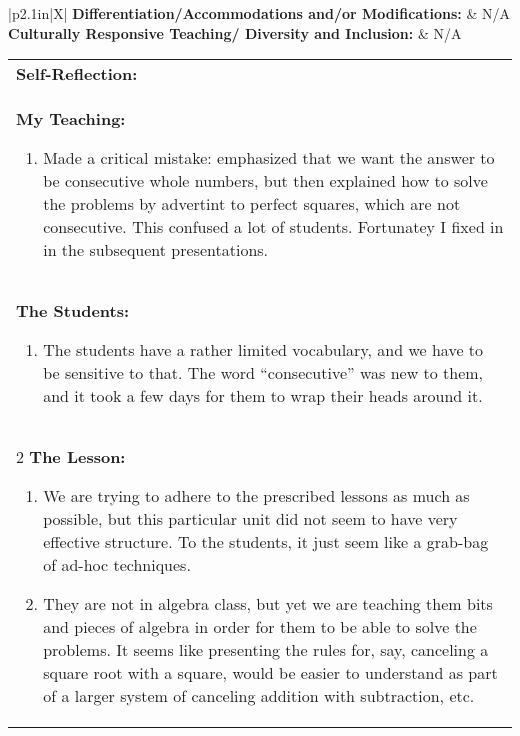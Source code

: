 \begin{small}
  \begin{tabularx}{\linewidth}{|p{2.1in}|X|}
    \hline
    \textbf{Differentiation/Accommodations and/or Modifications: } & N/A\\
    \hline
    \textbf{Culturally Responsive Teaching/ Diversity and Inclusion: } & N/A\\
    \hline
  \end{tabularx}
  
  \vskip 6pt

  \begin{tabularx}{\linewidth}{|X|}
    \hline
    \textbf{Self-Reflection:} \\
    \textbf{My Teaching:} 
    \begin{enumerate}
    \item Made a critical mistake: emphasized that we want the answer to
      be consecutive whole numbers, but then explained how to solve the
      problems by advertint to perfect squares, which are not
      consecutive.  This confused a lot of students.  Fortunatey I fixed
      in in the subsequent presentations.
    \end{enumerate} \\
    
    \textbf{The Students:}
    \begin{enumerate}
    \item The students have a rather limited vocabulary, and we have to
      be sensitive to that.  The word ``consecutive'' was new to them,
      and it took a few days for them to wrap their heads around it.
    \end{enumerate} \\
2    
    \textbf{The Lesson:}
           \begin{enumerate}
             \item We are trying to adhere to the prescribed lessons as much as
               possible, but this particular unit did not seem to have very
               effective structure.  To the students, it just seem like a grab-bag of ad-hoc techniques.
             \item They are not in algebra class, but yet we are teaching them
               bits and pieces of algebra in order for them to be able to solve
               the problems.   It seems like presenting the rules for, say, canceling a square root with a square, would be easier to understand as part of a larger system of canceling addition with subtraction, etc.  
           \end{enumerate} \\
           
           \hline
\end{tabularx}
\end{small}

